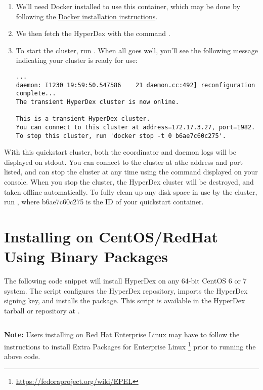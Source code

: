 \begin{enumerate}
\item We'll need Docker installed to use this container, which may be done by
following the \href{https://docs.docker.com/installation/}{Docker installation
instructions}.
\item We then fetch the HyperDex with the command .
\item To start the cluster, run .  When all goes well, you'll see the following message
indicating your cluster is ready for use:

\begin{verbatim}
...
daemon: I1230 19:59:50.547586    21 daemon.cc:492] reconfiguration complete...
The transient HyperDex cluster is now online.

This is a transient HyperDex cluster.
You can connect to this cluster at address=172.17.3.27, port=1982.
To stop this cluster, run 'docker stop -t 0 b6ae7c60c275'.
\end{verbatim}
\end{enumerate}

With this quickstart cluster, both the coordinator and daemon logs will be
displayed on stdout.  You can connect to the cluster at athe address and port
listed, and can stop the cluster at any time using the command displayed on your
console.  When you stop the cluster, the HyperDex cluster will be destroyed, and
taken offline automatically.  To fully clean up any disk space in use by the
cluster, run , where b6ae7c60c275 is the ID of your
quickstart container.

\section{Installing on CentOS/RedHat Using Binary Packages}

The following code snippet will install HyperDex on any 64-bit CentOS 6 or 7
system.  The script configures the HyperDex repository, imports the HyperDex
signing key, and installs the  package.  This script is available
in the HyperDex tarball or repository at .

\inputminted[frame=lines,framesep=2mm,firstline=5]{bash}{\topdir/install/centos-packages.sh}

\noindent\textbf{Note:}  Users installing on Red Hat Enterprise Linux may have
to follow the instructions to install Extra Packages for Enterprise Linux
\footnote{\url{https://fedoraproject.org/wiki/EPEL}} prior to running the above
code.

